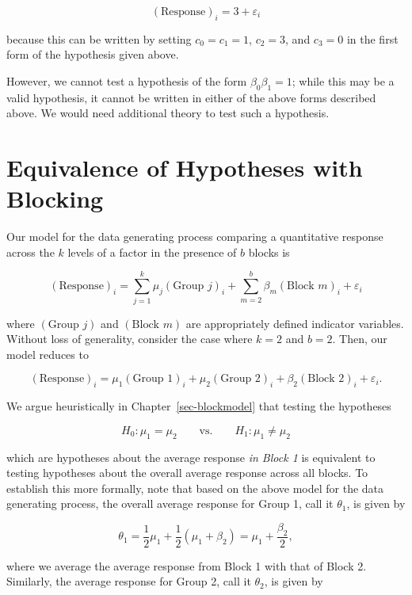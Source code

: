 \documentclass[
  letterpaper,
  DIV=11,
  numbers=noendperiod]{scrreprt}
\theoremstyle{plain}
\theoremstyle{definition}
\theoremstyle{definition}
\theoremstyle{remark}
\begin{document}
\[(\text{Response})_i = 3 + \varepsilon_i\]

because this can be written by setting \(c_0 = c_1 = 1\), \(c_2 = 3\),
and \(c_3 = 0\) in the first form of the hypothesis given above.

However, we cannot test a hypothesis of the form \(\beta_0\beta_1 = 1\);
while this may be a valid hypothesis, it cannot be written in either of
the above forms described above. We would need additional theory to test
such a hypothesis.

\hypertarget{equivalence-of-hypotheses-with-blocking}{%
\section{Equivalence of Hypotheses with
Blocking}\label{equivalence-of-hypotheses-with-blocking}}

Our model for the data generating process comparing a quantitative
response across the \(k\) levels of a factor in the presence of \(b\)
blocks is

\[(\text{Response})_i = \sum_{j=1}^{k} \mu_j (\text{Group } j)_i + \sum_{m=2}^{b} \beta_m (\text{Block } m)_i + \varepsilon_i\]

where \((\text{Group } j)\) and \((\text{Block } m)\) are appropriately
defined indicator variables. Without loss of generality, consider the
case where \(k = 2\) and \(b = 2\). Then, our model reduces to

\[(\text{Response})_i = \mu_1 (\text{Group 1})_i + \mu_2 (\text{Group 2})_i + \beta_2 (\text{Block 2})_i + \varepsilon_i.\]

We argue heuristically in Chapter~\ref{sec-blockmodel} that testing the
hypotheses

\[H_0: \mu_1 = \mu_2 \qquad \text{vs.} \qquad H_1: \mu_1 \neq \mu_2\]

which are hypotheses about the average response \emph{in Block 1} is
equivalent to testing hypotheses about the overall average response
across all blocks. To establish this more formally, note that based on
the above model for the data generating process, the overall average
response for Group 1, call it \(\theta_1\), is given by

\[\theta_1 = \frac{1}{2} \mu_1 + \frac{1}{2} \left(\mu_1 + \beta_2\right) = \mu_1 + \frac{\beta_2}{2},\]

where we average the average response from Block 1 with that of Block 2.
Similarly, the average response for Group 2, call it \(\theta_2\), is
given by
\end{document}
